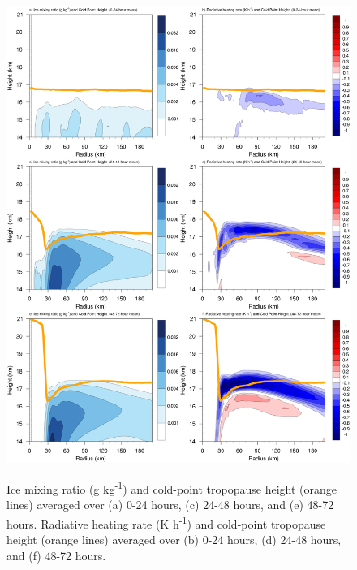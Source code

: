 \documentclass{ametsoc}
\begin{document}

\begin{figure}[ht]
\centerline{\includegraphics[width=39pc]{figures/qi+radten.png}}
\end{figure}
\begin{figure}
\caption{Ice mixing ratio (g kg\textsuperscript{-1}) and cold-point tropopause height (orange lines) averaged over (a) 0-24 hours, (c) 24-48 hours, and (e) 48-72 hours. Radiative heating rate (K h\textsuperscript{-1}) and cold-point tropopause height (orange lines) averaged over (b) 0-24 hours, (d) 24-48 hours, and (f) 48-72 hours.} 
\label{fig:qi+radten}
\end{figure}
\end{document}
